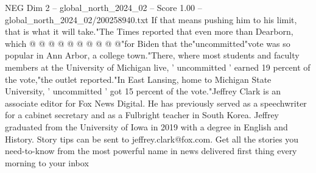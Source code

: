 \begin{textsample}{NEG Dim 2 – global\_north\_2024\_02 – Score 1.00 – global\_north\_2024\_02/200258940.txt}
If that means pushing him to his limit, that is what it will take."The Times reported that even more than Dearborn, which @ @ @ @ @ @ @ @ @ @"for Biden that the"uncommitted"vote was so popular in Ann Arbor, a college town."There, where most students and faculty members at the University of Michigan live, ' uncommitted ' earned 19 percent of the vote,"the outlet reported."In East Lansing, home to Michigan State University, ' uncommitted ' got 15 percent of the vote."Jeffrey Clark is an associate editor for Fox News Digital.
He has previously served as a speechwriter for a cabinet secretary and as a Fulbright teacher in South Korea.
Jeffrey graduated from the University of Iowa in 2019 with a degree in English and History.
Story tips can be sent to jeffrey.clark@fox.com.
Get all the stories you need-to-know from the most powerful name in news delivered first thing every morning to your inbox

\end{textsample}
